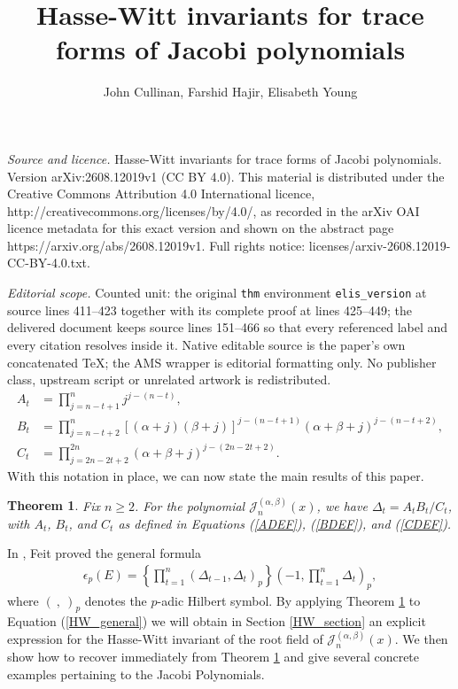 \documentclass[10pt,a4paper]{amsart}
\newtheorem{thm}[equation]{Theorem}
\begin{document}
\title[Hasse-Witt invariants for trace forms of Jacobi polynomials]{Hasse-Witt invariants for trace forms of Jacobi polynomials}
\author{John Cullinan, Farshid Hajir, Elisabeth Young}
\date{}
\maketitle
\noindent\emph{Source and licence.} Hasse-Witt invariants for trace forms of Jacobi polynomials. Version arXiv:2608.12019v1 (CC BY 4.0). This material is distributed under the Creative Commons Attribution 4.0 International licence, http://creativecommons.org/licenses/by/4.0/, as recorded in the arXiv OAI licence metadata for this exact version and shown on the abstract page https://arxiv.org/abs/2608.12019v1. Full rights notice: licenses/arxiv-2608.12019-CC-BY-4.0.txt.\par\smallskip
\noindent\textit{Editorial scope.} Counted unit: the original \texttt{thm} environment \texttt{elis\_version} at source lines 411--423 together with its complete proof at lines 425--449; the delivered document keeps source lines 151--466 so that every referenced label and every citation resolves inside it. Native editable source is the paper's own concatenated TeX; the AMS wrapper is editorial formatting only. No publisher class, upstream script or unrelated artwork is redistributed.
\begin{align}
A_{t} &= \prod_{j=n-t+1}^n j^{j-(n-t)}, \label{ADEF} \\
B_{t} &= \prod_{j=n-t+2}^n \left[(\alpha + j)(\beta+j)\right]^{j-(n-t+1)} \left(\alpha + \beta + j\right)^{j-(n-t+2)}, \label{BDEF} \\
C_{t} &= \prod_{j=2n-2t+2}^{2n} (\alpha + \beta + j)^{j-(2n-2t+2)}. \label{CDEF}
\end{align}
With this notation in place, we can now state the main results of this paper.

\begin{thm} \label{main_thm}
Fix $n \geq 2$.  For the polynomial  $\mathscr{J}_n^{(\alpha,\beta)}(x)$, we have $\Delta_{t} = A_{t}B_{t}/C_{t}$, with $A_t$, $B_t$, and $C_t$  as defined in Equations (\ref{ADEF}), (\ref{BDEF}), and (\ref{CDEF}).
\end{thm}

In \cite[Thm.~3.1]{feit}, Feit proved the general formula
\begin{align} \label{HW_general}
\epsilon_p(E) = \left\{ \prod_{t=1}^n \left( \Delta_{t-1},\Delta_{t} \right)_p \right\} \left( -1,\prod_{t=1}^n \Delta_{t} \right)_p,
\end{align}
where $(~,~)_p$ denotes the $p$-adic Hilbert symbol.  By applying Theorem \ref{main_thm} to Equation (\ref{HW_general}) we will obtain in Section \ref{HW_section} an explicit expression for the Hasse-Witt invariant of the root field of $\mathscr{J}_n^{(\alpha,\beta)}(x)$.  We then show how to recover \cite[Thm.~5.1]{feit} immediately from Theorem \ref{main_thm} and give several concrete examples pertaining to the Jacobi Polynomials.   
\end{document}
